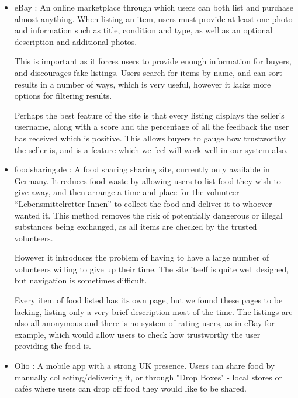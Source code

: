 \documentclass[12pt]{article}
\begin{document}
\begin{itemize}

    \item eBay \cite{ebay}: An online marketplace through which users can both list and
        purchase almost anything. When listing an item, users must provide at
        least one photo and information such as title, condition and type, as
        well as an optional description and additional photos.

        This is important as it forces users to provide enough information
        for buyers, and discourages fake listings.
        Users search for items by name, and can sort results in a number of
        ways, which is very useful, however it lacks more options for filtering
        results.
        
        Perhaps the best feature of the site is that every listing displays
        the seller’s username, along with a score and the percentage of all
        the feedback the user has received which is positive.
        This allows buyers to gauge how trustworthy the seller is, and is a
        feature which we feel will work well in our system also.


    \item foodsharing.de \cite{foodsharing}: A food sharing sharing site, currently only available
        in Germany.
        It reduces food waste by allowing users to list food they wish to give
        away, and then arrange a time and place for the volunteer
        “Lebensmittelretter Innen” to collect the food and deliver it to
        whoever wanted it.
        This method removes the risk of potentially dangerous or illegal
        substances being exchanged, as all items are checked by the trusted
        volunteers.
        
        However it introduces the problem of having to have a large number of
        volunteers willing to give up their time. The site itself is quite well
        designed, but navigation is sometimes difficult.

        Every item of food listed has its own page, but we found these pages to
        be lacking, listing only a very brief description most of the time.
        The listings are also all anonymous and there is no system of rating
        users, as in eBay for example, which would allow users to check how
        trustworthy the user providing the food is.
    
    \item Olio \cite{olio}: A mobile app with a strong UK presence.
        Users can share food by manually collecting/delivering it, or through
        "Drop Boxes" - local stores or cafés where users can drop off food
        they would like to be shared.
        

\end{itemize}
\end{document}
